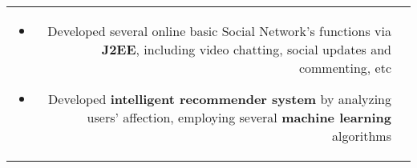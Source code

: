 \documentclass[a4paper, 10pt]{extarticle} %
\begin{document}
\begin{CJK*}{GBK}{song}
\begin{longtable}{r | p{15cm}}
{\begin{itemize}[leftmargin=*]
\item Developed several online basic Social Network’s functions via \textbf{J2EE}, including video chatting, social updates and commenting, etc

\item Developed \textbf{intelligent recommender system} by analyzing users’ affection, employing several \textbf{machine learning} algorithms

\vspace{-0.3cm}

\end{itemize}

}

\\


%		
%		
%		
%		
%		
%		
%
%
%

\end{longtable}


%
%
%		
%
%
%
%





\end{CJK*}
\end{document}
